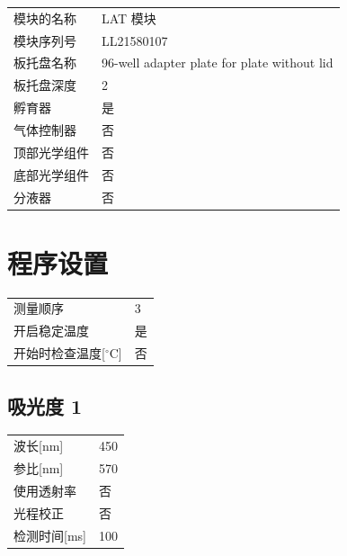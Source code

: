 \documentclass[UTF8,10pt,a4paper,fontset=fandol]{ctexart}
\newcommand{\fieldvalue}[1]{#1}
\begin{document}
\begin{tabular}{ll}
模块的名称 &
\fieldvalue{LAT 模块}\\
模块序列号 &
\fieldvalue{LL21580107}\\
板托盘名称 &
\fieldvalue{96-well adapter plate for plate without lid}\\
板托盘深度 &
\fieldvalue{2}\\
孵育器 &
\fieldvalue{是}\\
气体控制器 &
\fieldvalue{否}\\
顶部光学组件 &
\fieldvalue{否}\\
底部光学组件 &
\fieldvalue{否}\\
分液器 &
\fieldvalue{否}
\end{tabular}

\section*{程序设置}

\begin{tabular}{ll}
测量顺序 &
\fieldvalue{3}\\
开启稳定温度 &
\fieldvalue{是}\\
开始时检查温度[$^\circ$C] &
\fieldvalue{否}
\end{tabular}

\subsection*{吸光度 1}

\begin{tabular}{ll}
波长[nm] &
\fieldvalue{450}\\
参比[nm] &
\fieldvalue{570}\\
使用透射率 &
\fieldvalue{否}\\
光程校正 &
\fieldvalue{否}\\
检测时间[ms] &
\fieldvalue{100}
\end{tabular}
\end{document}
